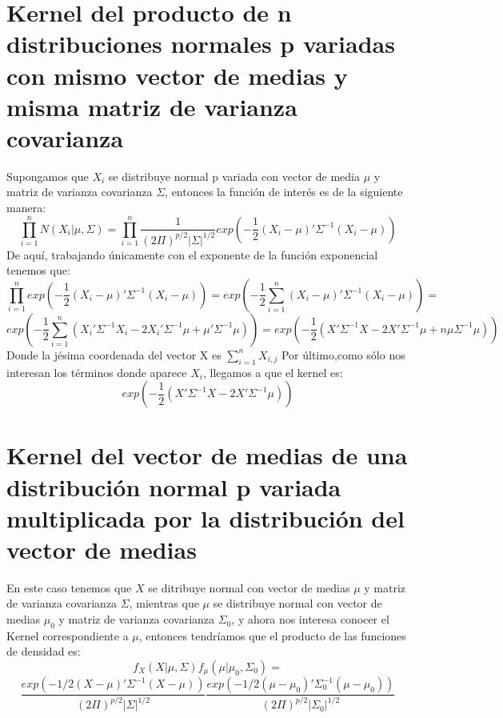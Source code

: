 \documentclass[11pt]{book}
\begin{document}
\section*{Kernel del producto de n distribuciones normales p variadas con mismo vector de medias y misma matriz de varianza covarianza}
Supongamos que $X_{i}$ se distribuye normal p variada con vector de media $\mu$ y matriz de varianza covarianza $\Sigma$, entonces la función de  interés es de la siguiente manera:
\begin{equation*}
\prod_{i=1}^{n}N(X_{i}|\mu,\Sigma)=\prod_{i=1}^{n}\dfrac{1}{(2\Pi)^{p/2}|\Sigma|^{1/2}}exp(-\frac{1}{2}(X_{i}-\mu)'\Sigma^{-1}(X_{i}-\mu))
\end{equation*}
De aquí, trabajando únicamente con el exponente de la función exponencial tenemos que:
\begin{equation*}
\prod_{i=1}^{n}exp(-\frac{1}{2}(X_{i}-\mu)'\Sigma^{-1}(X_{i}-\mu))=exp(-\frac{1}{2}\sum_{i=1}^{n} (X_{i}-\mu)'\Sigma^{-1}(X_{i}-\mu))=
\end{equation*} 
\begin{equation*}
exp(-\dfrac{1}{2}\sum_{i=1}^{n}(X_{i}'\Sigma^{-1}X_{i}-2X_{i}'\Sigma^{-1}\mu+\mu'\Sigma^{-1}\mu))=exp(-\frac{1}{2}(X'\Sigma^{-1}X-2X'\Sigma^{-1}\mu+n\mu\Sigma^{-1}\mu))
\end{equation*}
Donde la jésima coordenada del vector X es $\sum_{i=1}^{n}X_{i,j}$
Por último,como sólo nos interesan los términos donde aparece $X_{i}$, llegamos a que el kernel es:
\begin{equation*}
exp(-\frac{1}{2}(X'\Sigma^{-1}X-2X'\Sigma^{-1}\mu))
\end{equation*} 
\section*{Kernel del vector de medias de una distribución normal p variada multiplicada por la distribución del vector de medias}
En este caso tenemos que $X$ se ditribuye normal con vector de medias $\mu$ y matriz de varianza covarianza $\Sigma$, mientras que $\mu$ se distribuye normal con vector de medias $\mu_{0}$ y matriz de varianza covarianza $\Sigma_{0}$, y ahora nos interesa conocer el Kernel correspondiente a $\mu$, entonces tendríamos
que el producto de las funciones de densidad es:
\begin{equation*}
f_{X}(X|\mu,\Sigma)f_{\mu}(\mu|\mu_{0},\Sigma_{0})=    
\end{equation*}
\begin{equation*}
\dfrac{exp(-1/2(X-\mu)'\Sigma^{-1}(X-\mu))}{(2\Pi)^{p/2}|\Sigma|^{1/2}}       \dfrac{exp(-1/2(\mu-\mu_{0})'\Sigma_{0}^{-1}(\mu-\mu_{0}))}{(2\Pi)^{p/2}|\Sigma_{0}|^{1/2}}
\end{equation*}
\end{document}
